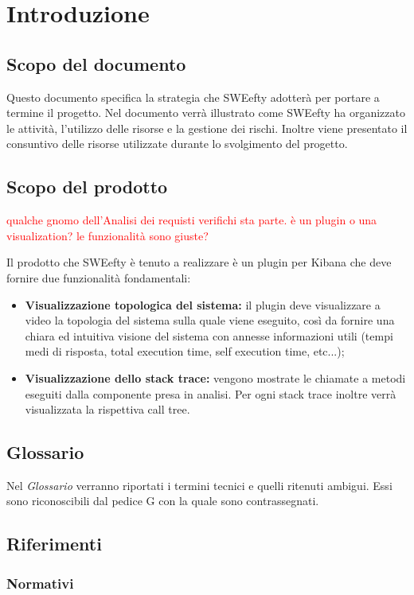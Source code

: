 
\section{Introduzione}
	\subsection{Scopo del documento}
	Questo documento specifica la strategia che SWEefty adotterà per portare a termine il progetto.
	Nel documento verrà illustrato come SWEefty ha organizzato le attività, l'utilizzo delle risorse e la gestione dei rischi.
	Inoltre viene presentato il consuntivo delle risorse utilizzate durante lo svolgimento del progetto.
	
	\subsection{Scopo del prodotto}
	\textcolor{red}{qualche gnomo dell'Analisi dei requisti verifichi sta parte. è un plugin o una visualization? le funzionalità sono giuste?}
	
	Il prodotto che SWEefty è tenuto a  realizzare è un plugin per Kibana che deve fornire due funzionalità fondamentali:
	\begin{itemize}
		\item \textbf{Visualizzazione topologica del sistema:} il plugin deve visualizzare a video la topologia del sistema sulla quale viene eseguito, così da fornire una chiara ed intuitiva visione del sistema con annesse informazioni utili (tempi medi di risposta, total execution time, self execution time, etc...);
		\item \textbf{Visualizzazione dello stack trace:} vengono mostrate le chiamate a metodi eseguiti dalla componente presa in analisi. Per ogni stack trace inoltre verrà visualizzata la rispettiva call tree.
	\end{itemize}

	\subsection{Glossario}
	Nel \emph{Glossario} verranno riportati i termini tecnici e quelli ritenuti ambigui. Essi sono riconoscibili dal pedice G con la quale sono contrassegnati.
	
	\subsection{Riferimenti}
			\subsubsection{Normativi}
